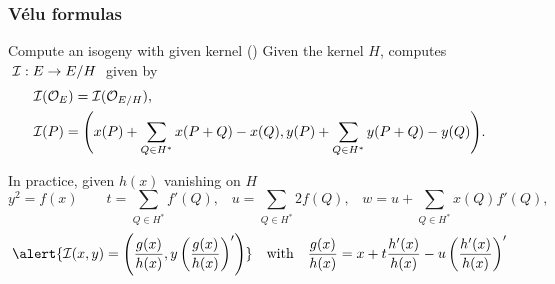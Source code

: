 \documentclass[10pt,usepdftitle=false]{beamer}
\begin{document}
\begin{frame}
  \frametitle{Vélu formulas}
  
  \begin{block}{Compute an isogeny with given kernel (\cite{velu71})}
    Given the kernel $H$, computes $\;\mathcal{I} : E\to E/H\;$ given by
    \begin{align*}
      &\mathcal{I}(\mathcal{O}_E) = \mathcal{I}(\mathcal{O}_{E/H})\text{,}\\
      &\begin{aligned}
        \mathcal{I}(P) = \Biggl(x(P) + \sum_{Q\in H^\ast}x(P+Q) - x(Q),
        y(P) + \sum_{Q\in H^\ast}y(P+Q) - y(Q) \Biggr) \text{.}
      \end{aligned}
    \end{align*}
  \end{block}

  \begin{block}{In practice, given $h(x)$ vanishing on $H$}
    {\footnotesize
      \[
      y^2 = f(x)
      \qquad
      t = \sum_{Q\in H^\ast} f'(Q)\text{,}
      \quad
      u = \sum_{Q\in H^\ast} 2f(Q)\text{,}
      \quad
      w = u + \sum_{Q\in H^\ast} x(Q)f'(Q)\text{,}\]}
    \[\alert{\I(x,y) = \left(\frac{g(x)}{h(x)}, y\left(\frac{g(x)}{h(x)}\right)'\right)}
    \quad\text{with}\quad
    \frac{g(x)}{h(x)} = x + t\frac{h'(x)}{h(x)} - u\left(\frac{h'(x)}{h(x)}\right)'\]
  \end{block}
\end{frame}

\end{document}
